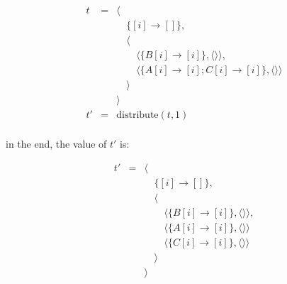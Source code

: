 \documentclass{article}
\begin{document}
\[
    \begin{array}{lcl}
        t &=& \langle \\
          & & \quad\{[i] \rightarrow [] \},\\
          & & \quad\langle \\
          & & \quad\quad \langle\{ B[i] \rightarrow [i] \}, \langle\rangle\rangle,\\
          & & \quad\quad \langle\{ A[i] \rightarrow [i]; C[i] \rightarrow [i] \}, \langle\rangle\rangle\\
          & & \quad\rangle \\
          & & \rangle \\
        t'&=& \mathrm{distribute}(t, 1) \\
    \end{array}
\]

\noindent in the end, the value of $t'$ is:

\[
    \begin{array}{lcl}
        t'&=& \langle \\
          & & \quad\{[i] \rightarrow [] \},\\
          & & \quad\langle \\
          & & \quad\quad \langle\{ B[i] \rightarrow [i] \}, \langle\rangle\rangle,\\
          & & \quad\quad \langle\{ A[i] \rightarrow [i] \}, \langle\rangle\rangle\\
          & & \quad\quad \langle\{ C[i] \rightarrow [i] \}, \langle\rangle\rangle\\
          & & \quad\rangle \\
          & & \rangle \\
    \end{array}
\]
\end{document}

